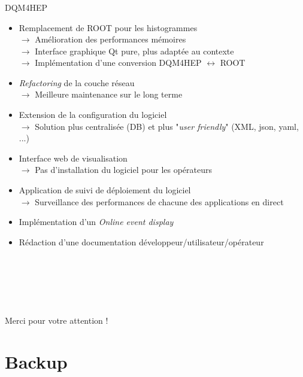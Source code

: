 \documentclass[8pt]{beamer}
\begin{document}
  \begin{frame}
  \frametitle{\secname}
  \framesubtitle{\subsecname}
    \begin{block}{DQM4HEP}
      \begin{itemize}
        \item Remplacement de ROOT pour les histogrammes \\
        $\rightarrow$ Amélioration des performances mémoires \\
        $\rightarrow$ Interface graphique Qt pure, plus adaptée au contexte \\
        $\rightarrow$ Implémentation d'une conversion DQM4HEP $\leftrightarrow$ ROOT
        \item \textit{Refactoring} de la couche réseau \\
        $\rightarrow$ Meilleure maintenance sur le long terme
        \item Extension de la configuration du logiciel \\
        $\rightarrow$ Solution plus centralisée (DB) et plus "\textit{user friendly}" (XML, json, yaml, ...)
        \item Interface web de visualisation \\
        $\rightarrow$ Pas d'installation du logiciel pour les opérateurs
        \item Application de suivi de déploiement du logiciel \\
        $\rightarrow$ Surveillance des performances de chacune des applications en direct
        \item Implémentation d'un \textit{Online event display}
        \item Rédaction d'une documentation développeur/utilisateur/opérateur
      \end{itemize}
    \end{block}
  \end{frame}

  \begin{frame}
    \begin{center}
      ~ \\
      ~ \\
      ~ \\
      ~ \\
      ~ \\
      \Large Merci pour votre attention !
    \end{center}
  \end{frame}

  \section*{Backup}
\end{document}
